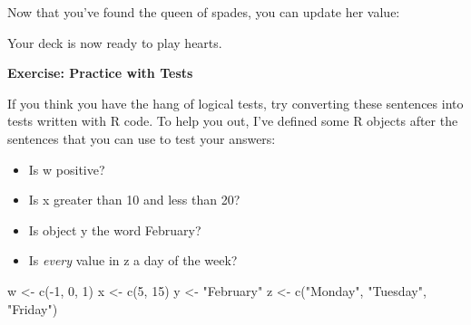\documentclass[
  letterpaper,
  DIV=11,
  numbers=noendperiod]{scrbook}
\newenvironment{Shaded}{\begin{snugshade}}{\end{snugshade}}
\newcommand{\DecValTok}[1]{\textcolor[rgb]{0.68,0.00,0.00}{#1}}
\newcommand{\DocumentationTok}[1]{\textcolor[rgb]{0.37,0.37,0.37}{\textit{#1}}}
\newcommand{\FunctionTok}[1]{\textcolor[rgb]{0.28,0.35,0.67}{#1}}
\newcommand{\NormalTok}[1]{\textcolor[rgb]{0.00,0.23,0.31}{#1}}
\newcommand{\OtherTok}[1]{\textcolor[rgb]{0.00,0.23,0.31}{#1}}
\newcommand{\SpecialCharTok}[1]{\textcolor[rgb]{0.37,0.37,0.37}{#1}}
\newcommand{\StringTok}[1]{\textcolor[rgb]{0.13,0.47,0.30}{#1}}
\providecommand{\tightlist}{%
  \setlength{\itemsep}{0pt}\setlength{\parskip}{0pt}}
\begin{document}
Now that you've found the queen of spades, you can update her value:

\begin{Shaded}
\end{Shaded}

Your deck is now ready to play hearts.

\begin{tcolorbox}[enhanced jigsaw, left=2mm, breakable, colback=white, colframe=quarto-callout-color-frame, leftrule=.75mm, bottomrule=.15mm, arc=.35mm, opacityback=0, rightrule=.15mm, toprule=.15mm]

\vspace{-3mm}\textbf{Exercise: Practice with Tests}\vspace{3mm}

If you think you have the hang of logical tests, try converting these
sentences into tests written with R code. To help you out, I've defined
some R objects after the sentences that you can use to test your
answers:

\begin{itemize}
\tightlist
\item
  Is w positive?
\item
  Is x greater than 10 and less than 20?
\item
  Is object y the word February?
\item
  Is \emph{every} value in z a day of the week?
\end{itemize}

\end{tcolorbox}

\begin{Shaded}
\begin{Highlighting}[]
\NormalTok{w }\OtherTok{\textless{}{-}} \FunctionTok{c}\NormalTok{(}\SpecialCharTok{{-}}\DecValTok{1}\NormalTok{, }\DecValTok{0}\NormalTok{, }\DecValTok{1}\NormalTok{)}
\NormalTok{x }\OtherTok{\textless{}{-}} \FunctionTok{c}\NormalTok{(}\DecValTok{5}\NormalTok{, }\DecValTok{15}\NormalTok{)}
\NormalTok{y }\OtherTok{\textless{}{-}} \StringTok{"February"}
\NormalTok{z }\OtherTok{\textless{}{-}} \FunctionTok{c}\NormalTok{(}\StringTok{"Monday"}\NormalTok{, }\StringTok{"Tuesday"}\NormalTok{, }\StringTok{"Friday"}\NormalTok{)}
\end{Highlighting}
\end{Shaded}
\end{document}
